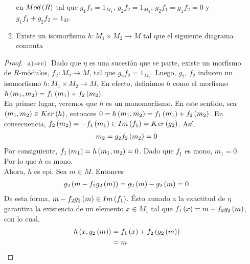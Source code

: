 \documentclass{article}
\begin{document}
\begin{enumerate}[label=\textbf{Ej \arabic*.}]
\begin{enumerate}
\begin{tikzcd}
			\end{tikzcd}
			en $Mod\lrprth{R}$ tal que $g_{1}f_{1}=1_{M_{1}}$, $g_{2}f_{2}=1_{M_{2}}$, $g_{2}f_{1}=g_{1}f_{2}=0$ y $g_{1}f_{1}+g_{2}f_{2}=1_{M}$.
			\item Existe un isomorfismo $h:M_{1} \times M_{2} \longrightarrow M$ tal que el siguiente diagrama conmuta\\
		\end{enumerate}
		\begin{proof}
			$\boxed{\text{a)}\Rightarrow\text{c)}}$ Dado que $\eta$ es una sucesión que se parte, existe un morfismo de $R$-módulos, $f_{2}:M_{2} \longrightarrow M$, tal que $g_{2}f_{2}=1_{M_{2}}$. Luego, $g_{2}$, $f_{2}$ inducen un isomorfismo $h:M_{1} \times M_{2} \longrightarrow M$. En efecto, definimos $h$ como el morfismo $h\lrprth{m_{1},m_{2}}=f_{1}\lrprth{m_{1}}+f_{2}\lrprth{m_{2}}$.\\
			
			En primer lugar, veremos que $h$ es un monomorfismo. En este sentido, sea $\lrprth{m_{1},m_{2}} \in Ker\lrprth{h}$, entonces $0=h\lrprth{m_{1},m_{2}}=f_{1}\lrprth{m_{1}}+f_{2}\lrprth{m_{2}}$. En consecuencia, $f_{2}\lrprth{m_{2}}=-f_{1}\lrprth{m_{1}}\in Im\lrprth{f_{1}}=Ker\lrprth{g_{2}}$. Así, 
			\begin{align*}
				m_{2}=g_{2}f_{2}\lrprth{m_{2}}=0
			\end{align*}
			Por consiguiente, $f_{1}\lrprth{m_{1}}=h\lrprth{m_{1},m_{2}}=0$. Dado que $f_{1}$ es mono, $m_{1}=0$. Por lo que $h$ es mono.\\
			
			Ahora, $h$ es epi. Sea $m \in M$. Entonces 
			\begin{align*}
				g_{2}\lrprth{m-f_{2}g_{2}\lrprth{m}}=g_{2}\lrprth{m}-g_{2}\lrprth{m}=0
			\end{align*}
			De esta forma, $m-f_{2}g_{2}\lrprth{m} \in Im\lrprth{f_{1}}$. Ésto aunado a la exactitud de $\eta$ garantiza la existencia de un elemento $x \in M_{1}$ tal que $f_{1}\lrprth{x}=m-f_{2}g_{2}\lrprth{m}$, con lo cual,
			\begin{align*}
				h\lrprth{x,g_{2}\lrprth{m}}&=f_{1}\lrprth{x}+f_{2}\lrprth{g_{2}\lrprth{m}}\\
				&=m
			\end{align*}
			

\end{proof}
\end{enumerate}
\end{document}
